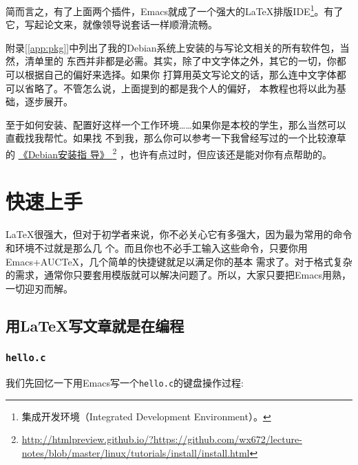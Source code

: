 \documentclass{swfcthesis}
\begin{document}
\begin{description}
  简而言之，有了上面两个插件，Emacs就成了一个强大的\LaTeX{}排版IDE\footnote{集成开发环境（Integrated
    Development Environment）。}。有了它，写起论文来，就像领导说套话一样顺滑流畅。
\end{description}

附录[\ref{app:pkg}]中列出了我的Debian系统上安装的与写论文相关的所有软件包，当然，清单里的
东西并非都是必需。其实，除了中文字体之外，其它的一切，你都可以根据自己的偏好来选择。如果你
打算用英文写论文的话，那么连中文字体都可以省略了。不管怎么说，上面提到的都是我个人的偏好，
本教程也将以此为基础，逐步展开。

至于如何安装、配置好这样一个工作环境……如果你是本校的学生，那么当然可以直截找我帮忙。如果找
不到我，那么你可以参考一下我曾经写过的一个比较潦草
的
\href{http://htmlpreview.github.io/?https://github.com/wx672/lecture-notes/blob/master/linux/tutorials/install/install.html}{
  《Debian安装指
  导》
}\footnote{\url{http://htmlpreview.github.io/?https://github.com/wx672/lecture-notes/blob/master/linux/tutorials/install/install.html}}
，也许有点过时，但应该还是能对你有点帮助的。


\chapter{快速上手}

\LaTeX{}很强大，但对于初学者来说，你不必关心它有多强大，因为最为常用的命令和环境不过就是那么几
个。而且你也不必手工输入这些命令，只要你用Emacs+AUC\TeX{}，几个简单的快捷键就足以满足你的基本
需求了。对于格式复杂的需求，通常你只要套用模版就可以解决问题了。所以，大家只要把Emacs用熟，
一切迎刃而解。

\section{用LaTeX写文章就是在编程}
\label{sec:hello}

\subsection{\texttt{hello.c}}
\label{sec:hello.c}

我们先回忆一下用Emacs写一个\texttt{hello.c}的键盘操作过程:
\end{document}
